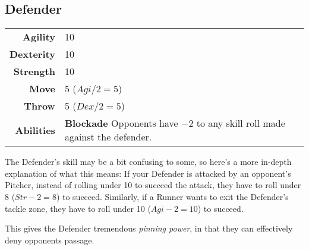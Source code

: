 \subsection{Defender}
\begin{tabular}{r|l}
    \textbf{Agility} & 10 \\
    \textbf{Dexterity} & 10 \\
    \textbf{Strength} & 10 \\ \hline
    \textbf{Move} & 5 ($Agi/2=5$)\\
    \textbf{Throw} & 5 ($Dex/2=5$) \\ \hline
    \textbf{Abilities} & \textbf{Blockade} Opponents have $-2$ to any skill roll made against the defender.
\end{tabular}

The Defender's skill may be a bit confusing to some, so here's a more in-depth explanation of what this means: If your Defender is attacked by an opponent's Pitcher, instead of rolling under 10 to succeed the attack, they have to roll under 8 ($Str-2=8$) to succeed. Similarly, if a Runner wants to exit the Defender's tackle zone, they have to roll under 10 ($Agi-2=10$) to succeed.

This gives the Defender tremendous \textit{pinning power}, in that they can effectively deny opponents passage.